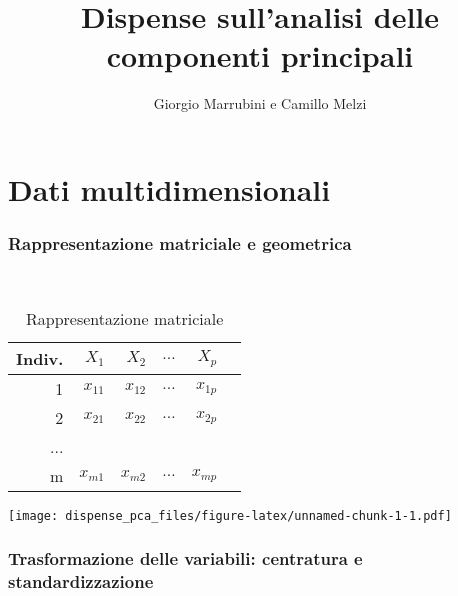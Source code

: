 \documentclass[
  11pt,
]{book}
\title{Dispense sull'analisi delle componenti principali}
\author{Giorgio Marrubini e Camillo Melzi}
\date{}
\begin{document}
\maketitle

{
\hypersetup{linkcolor=}
\setcounter{tocdepth}{1}
\tableofcontents
}
\hypertarget{section}{%
\chapter*{}\label{section}}

\hypertarget{dati-multidimensionali}{%
\chapter{Dati multidimensionali}\label{dati-multidimensionali}}

\hypertarget{rappresentazione-matriciale-e-geometrica}{%
\subsection{Rappresentazione matriciale e geometrica}\label{rappresentazione-matriciale-e-geometrica}}

\begin{table}[h]
\caption{Rappresentazione matriciale}
\label{tab:RegrMult}
\ 
\begin{center}
\begin{tabular}{rrrrrr}
\hline
Indiv. & $X_1$ & $X_2$ & $\dots$ & $X_p$ \\
\hline
1 & $x_{11}$ & $x_{12}$ & $\dots$ & $x_{1p}$\\
2 & $x_{21}$ & $x_{22}$ & $\dots$ & $x_{2p}$ \\
...\\
m & $x_{m1}$ & $x_{m2}$ & $\dots$ & $x_{mp}$ \\
\hline
\end{tabular}
\end{center}
\end{table}

\texttt{[image: dispense\_pca\_files/figure-latex/unnamed-chunk-1-1.pdf]}

\hypertarget{trasformazione-delle-variabili-centratura-e-standardizzazione}{%
\subsection{Trasformazione delle variabili: centratura e standardizzazione}\label{trasformazione-delle-variabili-centratura-e-standardizzazione}}
\end{document}
